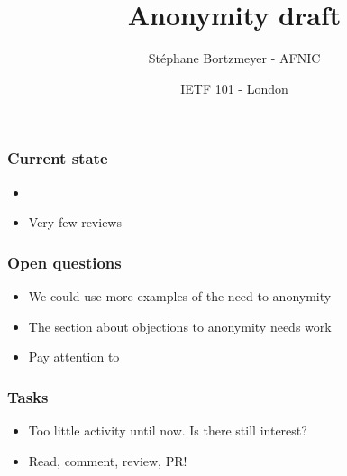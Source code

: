 \documentclass[ignorenonframetext]{beamer}
\title{Anonymity draft}
\author{Stéphane Bortzmeyer - AFNIC}
\date{IETF 101 - London}
\begin{document}
\begin{frame}
\maketitle  
\end{frame}

\begin{frame}
  \frametitle{Current state}
  \begin{itemize}
  \item<2->
  \item<3->Very few reviews  
  \end{itemize}
\end{frame}

\begin{frame}
  \frametitle{Open questions}
  \begin{itemize}
  \item<2->We could use more examples of the need to anonymity
  \item<3->The section about objections to anonymity needs work
  \item<4->Pay attention to 
  \end{itemize}
\end{frame}

\begin{frame}
  \frametitle{Tasks}
  \begin{itemize}
  \item<2->Too little activity until now. Is there still interest?
  \item<3->Read, comment, review, PR!
  \end{itemize}
\end{frame}
\end{document}
